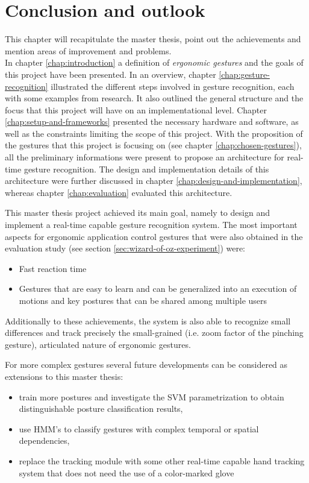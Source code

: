 \chapter{Conclusion and outlook}
\label{chap:conclusion-and-outlook}

This chapter will recapitulate the master thesis, point out the achievements and mention areas of improvement and problems. \\
In chapter \ref{chap:introduction} a definition of \textit{ergonomic gestures} and the goals of this project have been presented. In an overview, chapter \ref{chap:gesture-recognition} illustrated the different steps involved in gesture recognition, each with some examples from research. It also outlined the general structure and the focus that this project will have on an implementational level. Chapter \ref{chap:setup-and-frameworks} presented the necessary hardware and software, as well as the constraints limiting the scope of this project. With the proposition of the gestures that this project is focusing on (see chapter \ref{chap:chosen-gestures}), all the preliminary informations were present to propose an architecture for real-time gesture recognition. The design and implementation details of this architecture were further discussed in chapter \ref{chap:design-and-implementation}, whereas chapter \ref{chap:evaluation} evaluated this architecture.

This master thesis project achieved its main goal, namely to design and implement a real-time capable gesture recognition system. 
The most important aspects for ergonomic application control gestures that were also obtained in the evaluation study \cite{psychology} (see section \ref{sec:wizard-of-oz-experiment}) were:
\begin{itemize}
\item Fast reaction time
\item Gestures that are easy to learn and can be generalized into an execution of motions and key postures that can be shared among multiple users
\end{itemize}
Additionally to these achievements, the system is also able to recognize small differences and track precisely the small-grained (i.e. zoom factor of the pinching gesture), articulated nature of ergonomic gestures. 

For more complex gestures several future developments can be considered as extensions to this master thesis:
\begin{itemize}
\item train more postures and investigate the SVM parametrization to obtain distinguishable posture classification results,
\item use HMM's to classify gestures with complex temporal or spatial dependencies,
\item replace the tracking module with some other real-time capable hand tracking system that does not need the use of a color-marked glove
\end{itemize}

